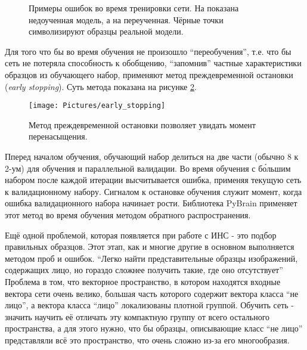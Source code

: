 \documentclass[12pt]{report}
\begin{document}
\begin{figure}[h]
	\centering
	\caption{Примеры ошибок во время тренировки сети. На  показана недоученная модель, а на 
 переученная. Чёрные точки символизируют образцы реальной модели. \citep{bradski2008learning}}
	\label{fig:under_over_fit}
\end{figure}

Для того что бы во время обучения не произошло ``переобучения'', т.е. что бы сеть не потеряла способность к 
обобщению, ``запомнив'' частные характеристики образцов из обучающего набор, применяют метод преждевременной 
остановки (\textit{early stopping}). Суть метода показана на рисунке \ref{fig:early_stop}.

\begin{figure}[h]
	\centering
	\texttt{[image: Pictures/early\_stopping]}
	\caption{Метод преждевременной остановки позволяет увидать момент перенасыщения.}
	\label{fig:early_stop}
\end{figure}

Пперед началом обучения, обучающий набор делиться на две части (обычно 8 к 2-ум) для обучения 
и 
параллельной валидации. Во время обучения с б\'{о}льшим набором после каждой итерации высчитывается ошибка, 
применяя 
текущую сеть к валидационному набору. Сигналом к остановке обучения служит момент, когда ошибка валидационного 
набора 
начинает рости. Библиотека PyBrain применяет этот метод во время обучения методом обратного распространения.

Ещё одной проблемой, которая появляется при работе с ИНС - это подбор правильных образцов. Этот этап, как и многие 
другие в основном выполняется методом проб и ошибок. ``Легко найти представительные образцы изображений, содержащих 
лицо, но гораздо сложнее получить такие, где оно отсутствует'' \citep{rowley1998neural} Проблема в том, что 
векторное 
пространство, в котором находятся входные вектора сети очень велико, большая часть которого содержит вектора класса 
``не лицо'', а вектора класса ``лицо'' локализованы плотной группой. Обучить сеть - значить научить её отличать эту 
компактную группу от всего остального пространства, а для этого нужно, что бы образцы, описывающие класс ``не лицо''
представляли всё это пространство, что очень сложно из-за его многообразия. %
\end{document}
